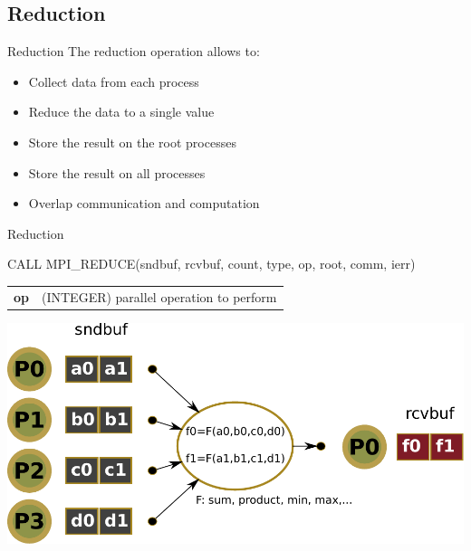\documentclass[aspectratio=43]{beamer}
\begin{document}
\subsection{Reduction}
\begin{frame}{Reduction}
The reduction operation allows to:
\begin{itemize}
\item Collect data from each process
\item Reduce the data to a single value
\item Store the result on the root processes
\item Store the result on all processes
\item Overlap communication and computation
\end{itemize}
\end{frame}

\begin{frame}[fragile]{Reduction}
\begin{Fortranlisting}[]{}
CALL MPI_REDUCE(sndbuf, rcvbuf, count, type, op,
                root, comm, ierr)
\end{Fortranlisting}
\begin{black1block}{}
\begin{tabular}{rp{8cm}}
\textbf{op} & (INTEGER) parallel operation to perform\\
\end{tabular}
\end{black1block}
\begin{center}
\includegraphics[scale=0.5]{03.MPI_Coll/reduce.pdf}
\end{center}
\end{frame}
\end{document}
